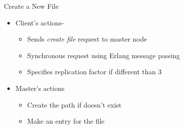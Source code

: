 \documentclass{beamer}
\begin{document}
\begin{frame}{Create a New File}
    \begin{figure}[h]
    \end{figure}
\begin{itemize}
\item Client's actions-
\begin{itemize}
\item Sends \textit{create file} request to master node
\item Synchronous request using Erlang message passing
\item Specifies replication factor if different than 3
\end{itemize}
\item Master's actions
\begin{itemize}
\item Create the path if doesn't exist
\item Make an entry for the file
\end{itemize}
\end{itemize}
\end{frame}
\end{document}

